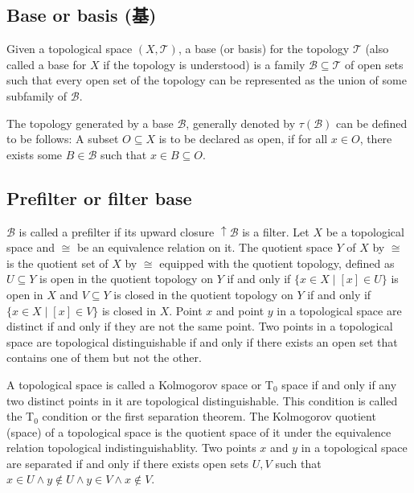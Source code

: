\documentclass[a4paper,12pt]{article}
\begin{document}
\subsection{Base or basis (基)}
Given a topological space $(X,\mathcal{T})$, a base (or basis) for the topology $\mathcal{T}$ (also called a base for $X$ if the topology is understood) is a family $\mathcal{B}\subseteq\mathcal{T}$ of open sets such that every open set of the topology can be represented as the union of some subfamily of $\mathcal{B}$.

The topology generated by a base $\mathcal{B}$, generally denoted by $\tau(\mathcal{B})$ can be defined to be follows: A subset $O\subseteq X$ is to be declared as open, if for all $x\in O$, there exists some $B\in\mathcal{B}$ such that $x\in B\subseteq O$.
\subsection{Prefilter or filter base}
$\mathcal{B}$ is called a prefilter if its upward closure $\uparrow\mathcal{B}$ is a filter.
Let $X$ be a topological space and $\cong$ be an equivalence relation on it. The quotient space $Y$ of $X$ by $\cong$ is the quotient set of $X$ by $\cong$ equipped with the quotient topology, defined as $U\subseteq Y$ is open in the quotient topology on $Y$ if and only if $\{x\in X\mid[x]\in U\}$ is open in $X$ and $V\subseteq Y$ is closed in the quotient topology on $Y$ if and only if $\{x\in X\mid[x]\in V\}$ is closed in $X$.
Point $x$ and point $y$ in a topological space are distinct if and only if they are not the same point.
Two points in a topological space are topological distinguishable if and only if there exists an open set that contains one of them but not the other.

A topological space is called a Kolmogorov space or T$_0$ space if and only if any two distinct points in it are topological distinguishable. This condition is called the T$_0$ condition or the first separation theorem.
The Kolmogorov quotient (space) of a topological space is the quotient space of it under the equivalence relation topological indistinguishablity.
Two points $x$ and $y$ in a topological space are separated if and only if there exists open sets $U,V$ such that $x\in U\land y\notin U\land y\in V\land x\notin V$.
\end{document}
